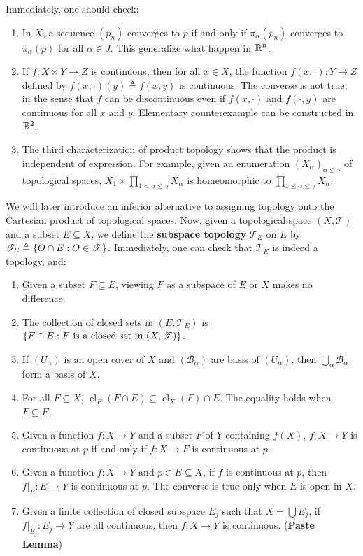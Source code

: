 \documentclass{report}
\begin{document}
\begin{mdframed}
Immediately, one should check:
\begin{enumerate}[label=(\alph*)]
    \item In $X$, a sequence $(p_n)$ converges to $p$ if and only if $\pi_\alpha(p_n)$ converges to $\pi_\alpha(p)$ for all $\alpha \in J$. This generalize what happen in $\mathbb{R}^n$. 
    \item If $f : X \times Y \to Z$ is continuous, then for all $x \in X$, the function $f(x,\cdot) : Y \to Z$ defined by $f(x,\cdot)(y) \triangleq f(x, y)$ is continuous. The converse is not true, in the sense that $f$ can be discontinuous even if $f(x,\cdot)$ and $f(\cdot, y)$ are continuous for all $x$ and $y$. Elementary
counterexample can be constructed in $\mathbb{R}^2$.
    \item The third characterization of product topology shows that the product is independent of expression. For example, given an enumeration $(X_\alpha)_{\alpha \leq \gamma}$ of topological spaces, $X_1 \times \prod_{1 < \alpha \leq \gamma} X_\alpha$ is homeomorphic to $\prod_{1 \leq \alpha \leq \gamma} X_\alpha$.
\end{enumerate}
We will later introduce an inferior alternative to assigning topology onto the Cartesian product of topological spaces. Now, given a topological space $(X, \mathscr{T})$ and a subset $E \subseteq X$, we define the \textbf{subspace topology} $\mathscr{T}_E$ on $E$ by $\mathscr{T}_E \triangleq \{ O \cap E : O \in \mathscr{T} \}$. Immediately, one can check that $\mathscr{T}_E$ is indeed a topology, and:
\begin{enumerate}[label=(\alph*)]
    \item Given a subset $F \subseteq E$, viewing $F$ as a subspace of $E$ or $X$ makes no difference.
    \item The collection of closed sets in $(E, \mathscr{T}_E)$ is $\{ F \cap E : F \text{ is a closed set in } (X, \mathscr{T}) \}$. 
    \item If $(U_\alpha )$ is an open cover of $X$ and $(\mathcal{B}_\alpha )$  are basis of $(U_\alpha) $, then  $\bigcup_\alpha \mathcal{B}_\alpha  $ form a basis of $X$. 
    \item For all $F \subseteq X$, $\operatorname{cl}_E(F \cap E) \subseteq \operatorname{cl}_X(F) \cap E$. The equality holds when $F \subseteq E$.
  \item Given a function $f : X \to Y$ and a subset $F$ of $Y$ containing $f(X)$, $f : X \to Y$ is continuous at $p$ if and only if $f : X \to F$ is continuous at $p$.
    \item Given a function $f : X \to Y$ and $p \in E \subseteq X$, if $f$ is continuous at $p$, then $f|_E : E \to Y$ is continuous at $p$. The converse is true only when $E$ is open in $X$.
  \item Given a finite collection of closed subspace $E_j$ such that  $X=\bigcup E_j$, if $f|_{E_j}:E_j\rightarrow Y$ are all continuous, then $f:X\rightarrow Y$ is continuous. (\textbf{Paste Lemma})
\end{enumerate}
\end{mdframed}
\end{document}
